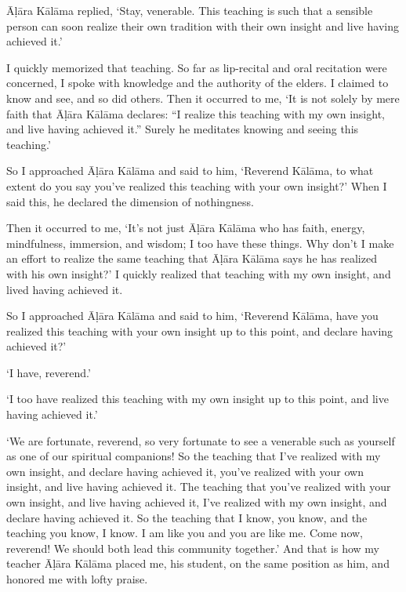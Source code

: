 \documentclass[12pt,openany]{book}%
\begin{document}
\textsanskrit{Āḷāra} \textsanskrit{Kālāma} replied, ‘Stay, venerable. This teaching is such that a sensible person can soon realize their own tradition with their own insight and live having achieved it.’ 

I quickly memorized that teaching. So far as lip-recital and oral recitation were concerned, I spoke with knowledge and the authority of the elders. I claimed to know and see, and so did others. Then it occurred to me, ‘It is not solely by mere faith that \textsanskrit{Āḷāra} \textsanskrit{Kālāma} declares: “I realize this teaching with my own insight, and live having achieved it.” Surely he meditates knowing and seeing this teaching.’ 

So I approached \textsanskrit{Āḷāra} \textsanskrit{Kālāma} and said to him, ‘Reverend \textsanskrit{Kālāma}, to what extent do you say you’ve realized this teaching with your own insight?’ When I said this, he declared the dimension of nothingness. 

Then it occurred to me, ‘It’s not just \textsanskrit{Āḷāra} \textsanskrit{Kālāma} who has faith, energy, mindfulness, immersion, and wisdom; I too have these things. Why don’t I make an effort to realize the same teaching that \textsanskrit{Āḷāra} \textsanskrit{Kālāma} says he has realized with his own insight?’ I quickly realized that teaching with my own insight, and lived having achieved it. 

So I approached \textsanskrit{Āḷāra} \textsanskrit{Kālāma} and said to him, ‘Reverend \textsanskrit{Kālāma}, have you realized this teaching with your own insight up to this point, and declare having achieved it?’ 

‘I have, reverend.’ 

‘I too have realized this teaching with my own insight up to this point, and live having achieved it.’ 

‘We are fortunate, reverend, so very fortunate to see a venerable such as yourself as one of our spiritual companions! So the teaching that I’ve realized with my own insight, and declare having achieved it, you’ve realized with your own insight, and live having achieved it. The teaching that you’ve realized with your own insight, and live having achieved it, I’ve realized with my own insight, and declare having achieved it. So the teaching that I know, you know, and the teaching you know, I know. I am like you and you are like me. Come now, reverend! We should both lead this community together.’ And that is how my teacher \textsanskrit{Āḷāra} \textsanskrit{Kālāma} placed me, his student, on the same position as him, and honored me with lofty praise. 
\end{document}
